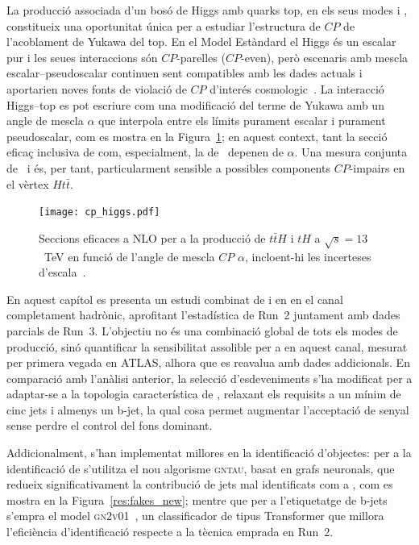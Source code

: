 La producció associada d’un bosó de Higgs amb quarks top, en els seus modes \ttH i \thqb, constitueix una oportunitat única per a estudiar l’estructura de $CP$ de l’acoblament de Yukawa del top.  
En el Model Estàndard el Higgs és un escalar pur i les seues interaccions són $CP$-parelles ($CP$-even), però escenaris amb mescla escalar–pseudoscalar continuen sent compatibles amb les dades actuals i aportarien noves fonts de violació de $CP$ d’interés cosmologic~\cite{Gunion:1996xu, Ellis:2013yxa, He:2015spx, Boudjema:2015nda}.  
La interacció Higgs–top es pot escriure com una modificació del terme de Yukawa amb un angle de mescla $\alpha$ que interpola entre els límits purament escalar i purament pseudoscalar, com es mostra en la Figura~\ref{res:th_cp_dependence}; en aquest context, tant la secció eficaç inclusiva de \ttH com, especialment, la de \tH\ depenen de $\alpha$.  
Una mesura conjunta de \ttH\ i \thqb és, per tant, particularment sensible a possibles components $CP$-impairs en el vèrtex $Ht\bar t$.

\begin{figure}[htbp]
  \centering
  \texttt{[image: cp\_higgs.pdf]}
  \caption{Seccions eficaces a NLO per a la producció de $t\bar{t}H$ i $tH$ a $\sqrt{s}=13$~TeV en funció de l’angle de mescla $CP$ $\alpha$, incloent-hi les incerteses d’escala~\cite{demartin2015}.}
  \label{res:th_cp_dependence}
\end{figure}

En aquest capítol es presenta un estudi combinat de \ttH i \thqb en \htautau en el canal completament hadrònic, aprofitant l’estadística de Run~2 juntament amb dades parcials de Run~3.  
L’objectiu no és una combinació global de tots els modes de producció, sinó quantificar la sensibilitat assolible per a \thqb en aquest canal, mesurat per primera vegada en ATLAS, alhora que es reavalua \ttH amb dades addicionals.  
En comparació amb l’anàlisi anterior, la selecció d’esdeveniments s’ha modificat per a adaptar-se a la topologia característica de \thqb, relaxant els requisits a un mínim de cinc jets i almenys un b-jet, la qual cosa permet augmentar l’acceptació de senyal sense perdre el control del fons dominant.  

Addicionalment, s’han implementat millores en la identificació d’objectes: per a la identificació de \tauhad s’utilitza el nou algorisme \textsc{gntau}, basat en grafs neuronals, que redueix significativament la contribució de jets mal identificats com a \tauhad, com es mostra en la Figura~\ref{res:fakes_new}; mentre que per a l’etiquetatge de b-jets s’empra el model \textsc{gn2v01}~\cite{new_tagging}, un classificador de tipus Transformer que millora l’eficiència d’identificació respecte a la tècnica emprada en Run~2.  

